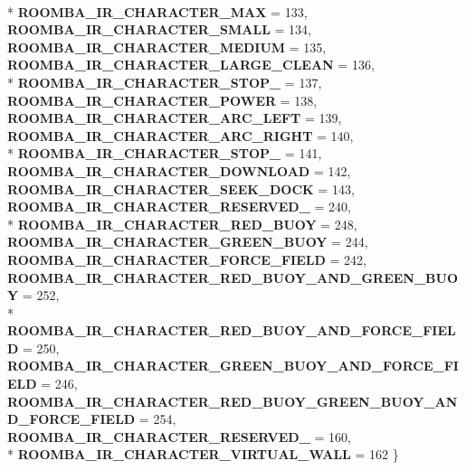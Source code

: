 \begin{DoxyCompactItemize}
\\*
{\bfseries R\+O\+O\+M\+B\+A\+\_\+\+I\+R\+\_\+\+C\+H\+A\+R\+A\+C\+T\+E\+R\+\_\+\+M\+A\+X} = 133, 
{\bfseries R\+O\+O\+M\+B\+A\+\_\+\+I\+R\+\_\+\+C\+H\+A\+R\+A\+C\+T\+E\+R\+\_\+\+S\+M\+A\+L\+L} = 134, 
{\bfseries R\+O\+O\+M\+B\+A\+\_\+\+I\+R\+\_\+\+C\+H\+A\+R\+A\+C\+T\+E\+R\+\_\+\+M\+E\+D\+I\+U\+M} = 135, 
{\bfseries R\+O\+O\+M\+B\+A\+\_\+\+I\+R\+\_\+\+C\+H\+A\+R\+A\+C\+T\+E\+R\+\_\+\+L\+A\+R\+G\+E\+\_\+\+C\+L\+E\+A\+N} = 136, 
\\*
{\bfseries R\+O\+O\+M\+B\+A\+\_\+\+I\+R\+\_\+\+C\+H\+A\+R\+A\+C\+T\+E\+R\+\_\+\+S\+T\+O\+P\+\_} = 137, 
{\bfseries R\+O\+O\+M\+B\+A\+\_\+\+I\+R\+\_\+\+C\+H\+A\+R\+A\+C\+T\+E\+R\+\_\+\+P\+O\+W\+E\+R} = 138, 
{\bfseries R\+O\+O\+M\+B\+A\+\_\+\+I\+R\+\_\+\+C\+H\+A\+R\+A\+C\+T\+E\+R\+\_\+\+A\+R\+C\+\_\+\+L\+E\+F\+T} = 139, 
{\bfseries R\+O\+O\+M\+B\+A\+\_\+\+I\+R\+\_\+\+C\+H\+A\+R\+A\+C\+T\+E\+R\+\_\+\+A\+R\+C\+\_\+\+R\+I\+G\+H\+T} = 140, 
\\*
{\bfseries R\+O\+O\+M\+B\+A\+\_\+\+I\+R\+\_\+\+C\+H\+A\+R\+A\+C\+T\+E\+R\+\_\+\+S\+T\+O\+P\+\_} = 141, 
{\bfseries R\+O\+O\+M\+B\+A\+\_\+\+I\+R\+\_\+\+C\+H\+A\+R\+A\+C\+T\+E\+R\+\_\+\+D\+O\+W\+N\+L\+O\+A\+D} = 142, 
{\bfseries R\+O\+O\+M\+B\+A\+\_\+\+I\+R\+\_\+\+C\+H\+A\+R\+A\+C\+T\+E\+R\+\_\+\+S\+E\+E\+K\+\_\+\+D\+O\+C\+K} = 143, 
{\bfseries R\+O\+O\+M\+B\+A\+\_\+\+I\+R\+\_\+\+C\+H\+A\+R\+A\+C\+T\+E\+R\+\_\+\+R\+E\+S\+E\+R\+V\+E\+D\+\_} = 240, 
\\*
{\bfseries R\+O\+O\+M\+B\+A\+\_\+\+I\+R\+\_\+\+C\+H\+A\+R\+A\+C\+T\+E\+R\+\_\+\+R\+E\+D\+\_\+\+B\+U\+O\+Y} = 248, 
{\bfseries R\+O\+O\+M\+B\+A\+\_\+\+I\+R\+\_\+\+C\+H\+A\+R\+A\+C\+T\+E\+R\+\_\+\+G\+R\+E\+E\+N\+\_\+\+B\+U\+O\+Y} = 244, 
{\bfseries R\+O\+O\+M\+B\+A\+\_\+\+I\+R\+\_\+\+C\+H\+A\+R\+A\+C\+T\+E\+R\+\_\+\+F\+O\+R\+C\+E\+\_\+\+F\+I\+E\+L\+D} = 242, 
{\bfseries R\+O\+O\+M\+B\+A\+\_\+\+I\+R\+\_\+\+C\+H\+A\+R\+A\+C\+T\+E\+R\+\_\+\+R\+E\+D\+\_\+\+B\+U\+O\+Y\+\_\+\+A\+N\+D\+\_\+\+G\+R\+E\+E\+N\+\_\+\+B\+U\+O\+Y} = 252, 
\\*
{\bfseries R\+O\+O\+M\+B\+A\+\_\+\+I\+R\+\_\+\+C\+H\+A\+R\+A\+C\+T\+E\+R\+\_\+\+R\+E\+D\+\_\+\+B\+U\+O\+Y\+\_\+\+A\+N\+D\+\_\+\+F\+O\+R\+C\+E\+\_\+\+F\+I\+E\+L\+D} = 250, 
{\bfseries R\+O\+O\+M\+B\+A\+\_\+\+I\+R\+\_\+\+C\+H\+A\+R\+A\+C\+T\+E\+R\+\_\+\+G\+R\+E\+E\+N\+\_\+\+B\+U\+O\+Y\+\_\+\+A\+N\+D\+\_\+\+F\+O\+R\+C\+E\+\_\+\+F\+I\+E\+L\+D} = 246, 
{\bfseries R\+O\+O\+M\+B\+A\+\_\+\+I\+R\+\_\+\+C\+H\+A\+R\+A\+C\+T\+E\+R\+\_\+\+R\+E\+D\+\_\+\+B\+U\+O\+Y\+\_\+\+G\+R\+E\+E\+N\+\_\+\+B\+U\+O\+Y\+\_\+\+A\+N\+D\+\_\+\+F\+O\+R\+C\+E\+\_\+\+F\+I\+E\+L\+D} = 254, 
{\bfseries R\+O\+O\+M\+B\+A\+\_\+\+I\+R\+\_\+\+C\+H\+A\+R\+A\+C\+T\+E\+R\+\_\+\+R\+E\+S\+E\+R\+V\+E\+D\+\_} = 160, 
\\*
{\bfseries R\+O\+O\+M\+B\+A\+\_\+\+I\+R\+\_\+\+C\+H\+A\+R\+A\+C\+T\+E\+R\+\_\+\+V\+I\+R\+T\+U\+A\+L\+\_\+\+W\+A\+L\+L} = 162
 \}\label{group__roomba-lib_ga2026337683ba0d60af6b639e7a56456d}


\end{DoxyCompactItemize}
